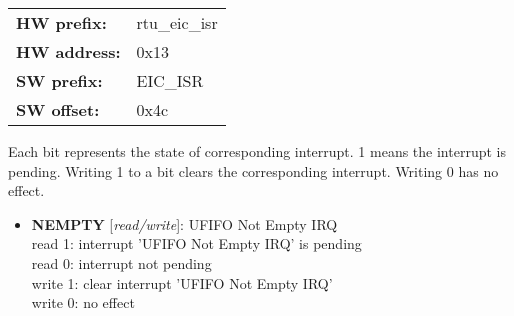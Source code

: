 \begin{tabular}{l l }
{\bf HW prefix:}  & rtu\_eic\_isr\\
{\bf HW address:}  & 0x13\\
{\bf SW prefix:}  & EIC\_ISR\\
{\bf SW offset:}  & 0x4c\\
\end{tabular}

\vspace{12pt}
Each bit represents the state of corresponding interrupt. 1 means the interrupt is pending. Writing 1 to a bit clears the corresponding interrupt. Writing 0 has no effect.

\vspace{12pt}
\noindent
{}

\begin{itemize}
\item \begin{small}
{\bf 
NEMPTY
} [\emph{read/write}]: UFIFO Not Empty IRQ
\\
read 1: interrupt 'UFIFO Not Empty IRQ' is pending\\read 0: interrupt not pending\\write 1: clear interrupt 'UFIFO Not Empty IRQ'\\write 0: no effect
\end{small}
\end{itemize}
